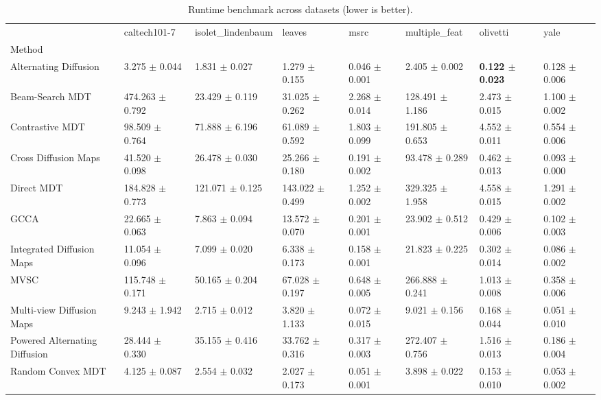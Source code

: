 \begin{table}
\caption{Runtime benchmark across datasets (lower is better).}
\label{tab:runtime_dataset}
\begin{tabular}{llllllll}
\toprule
 & caltech101-7 & isolet_lindenbaum & leaves & msrc & multiple_feat & olivetti & yale \\
Method &  &  &  &  &  &  &  \\
\midrule
Alternating Diffusion & 3.275 $\pm$ 0.044 & 1.831 $\pm$ 0.027 & 1.279 $\pm$ 0.155 & 0.046 $\pm$ 0.001 & 2.405 $\pm$ 0.002 & \textbf{0.122 $\pm$ 0.023} & 0.128 $\pm$ 0.006 \\
Beam-Search MDT & 474.263 $\pm$ 0.792 & 23.429 $\pm$ 0.119 & 31.025 $\pm$ 0.262 & 2.268 $\pm$ 0.014 & 128.491 $\pm$ 1.186 & 2.473 $\pm$ 0.015 & 1.100 $\pm$ 0.002 \\
Contrastive MDT & 98.509 $\pm$ 0.764 & 71.888 $\pm$ 6.196 & 61.089 $\pm$ 0.592 & 1.803 $\pm$ 0.099 & 191.805 $\pm$ 0.653 & 4.552 $\pm$ 0.011 & 0.554 $\pm$ 0.006 \\
Cross Diffusion Maps & 41.520 $\pm$ 0.098 & 26.478 $\pm$ 0.030 & 25.266 $\pm$ 0.180 & 0.191 $\pm$ 0.002 & 93.478 $\pm$ 0.289 & 0.462 $\pm$ 0.013 & 0.093 $\pm$ 0.000 \\
Direct MDT & 184.828 $\pm$ 0.773 & 121.071 $\pm$ 0.125 & 143.022 $\pm$ 0.499 & 1.252 $\pm$ 0.002 & 329.325 $\pm$ 1.958 & 4.558 $\pm$ 0.015 & 1.291 $\pm$ 0.002 \\
GCCA & 22.665 $\pm$ 0.063 & 7.863 $\pm$ 0.094 & 13.572 $\pm$ 0.070 & 0.201 $\pm$ 0.001 & 23.902 $\pm$ 0.512 & 0.429 $\pm$ 0.006 & 0.102 $\pm$ 0.003 \\
Integrated Diffusion Maps & 11.054 $\pm$ 0.096 & 7.099 $\pm$ 0.020 & 6.338 $\pm$ 0.173 & 0.158 $\pm$ 0.001 & 21.823 $\pm$ 0.225 & 0.302 $\pm$ 0.014 & 0.086 $\pm$ 0.002 \\
MVSC & 115.748 $\pm$ 0.171 & 50.165 $\pm$ 0.204 & 67.028 $\pm$ 0.197 & 0.648 $\pm$ 0.005 & 266.888 $\pm$ 0.241 & 1.013 $\pm$ 0.008 & 0.358 $\pm$ 0.006 \\
Multi-view Diffusion Maps & 9.243 $\pm$ 1.942 & 2.715 $\pm$ 0.012 & 3.820 $\pm$ 1.133 & 0.072 $\pm$ 0.015 & 9.021 $\pm$ 0.156 & 0.168 $\pm$ 0.044 & 0.051 $\pm$ 0.010 \\
Powered Alternating Diffusion & 28.444 $\pm$ 0.330 & 35.155 $\pm$ 0.416 & 33.762 $\pm$ 0.316 & 0.317 $\pm$ 0.003 & 272.407 $\pm$ 0.756 & 1.516 $\pm$ 0.013 & 0.186 $\pm$ 0.004 \\
Random Convex MDT & 4.125 $\pm$ 0.087 & 2.554 $\pm$ 0.032 & 2.027 $\pm$ 0.173 & 0.051 $\pm$ 0.001 & 3.898 $\pm$ 0.022 & 0.153 $\pm$ 0.010 & 0.053 $\pm$ 0.002 \\

\end{tabular}
\end{table}
